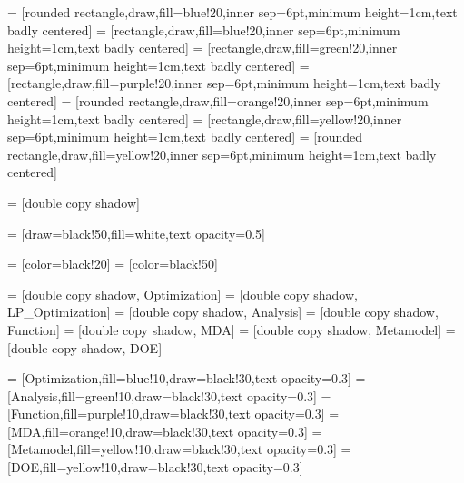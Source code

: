 
 = [rounded rectangle,draw,fill=blue!20,inner sep=6pt,minimum height=1cm,text badly centered]
 = [rectangle,draw,fill=blue!20,inner sep=6pt,minimum height=1cm,text badly centered]
 = [rectangle,draw,fill=green!20,inner sep=6pt,minimum height=1cm,text badly centered]
 = [rectangle,draw,fill=purple!20,inner sep=6pt,minimum height=1cm,text badly centered]
 = [rounded rectangle,draw,fill=orange!20,inner sep=6pt,minimum height=1cm,text badly centered]
 = [rectangle,draw,fill=yellow!20,inner sep=6pt,minimum height=1cm,text badly centered]
 = [rounded rectangle,draw,fill=yellow!20,inner sep=6pt,minimum height=1cm,text badly centered]

 = [double copy shadow]

 = [draw=black!50,fill=white,text opacity=0.5]

 = [color=black!20]
 = [color=black!50]

 = [double copy shadow, Optimization]
 = [double copy shadow, LP_Optimization]
 = [double copy shadow, Analysis]
 = [double copy shadow, Function]
 = [double copy shadow, MDA]
 = [double copy shadow, Metamodel]
 = [double copy shadow, DOE]

 = [Optimization,fill=blue!10,draw=black!30,text opacity=0.3]
 = [Analysis,fill=green!10,draw=black!30,text opacity=0.3]
 = [Function,fill=purple!10,draw=black!30,text opacity=0.3]
 = [MDA,fill=orange!10,draw=black!30,text opacity=0.3]
 = [Metamodel,fill=yellow!10,draw=black!30,text opacity=0.3]
 = [DOE,fill=yellow!10,draw=black!30,text opacity=0.3]

